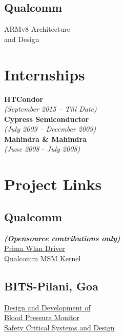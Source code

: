 \documentclass[letterpaper]{deedy-resume} %
\begin{document}
\begin{minipage}[t]{0.25\textwidth}
\subsection{Qualcomm}
\textbullet{} ARMv8 Architecture \\ \hphantom{\textbullet{}} and Design
\lsectionspace %
\section{Internships}
\footnotesize \textbf{HTCondor} \\
\footnotesize \textit{(September 2015 – Till Date)} \\
\footnotesize \textbf{Cypress Semiconductor} \\
\footnotesize \textit{(July 2009 – December 2009)} \\
\footnotesize \textbf{Mahindra \& Mahindra} \\
\footnotesize \textit{(June 2008 - July 2008)}
\lsectionspace %
\section{Project Links}
\subsection{Qualcomm}
\footnotesize \textit{\textbf{(Opensource contributions only)} } \\
\textbullet{} \href{https://www.codeaurora.org/cgit/quic/la/platform/vendor/qcom-opensource/wlan/prima/}{Prima Wlan Driver} \\
\textbullet{} \href{https://www.codeaurora.org/cgit/quic/la/kernel/msm-3.10}{Qualcomm MSM Kernel} \\
\subsection{BITS-Pilani, Goa}
\textbullet{} \href{http://www.scribd.com/doc/248438366/Design-and-Development-of-a-Blood-Pressure-Monitor}{Design and Development of \\ \hphantom{\textbullet{}} Blood Pressure Monitor} \\
\textbullet{} \href{http://www.scribd.com/doc/248440573/Safety-Critical-Systems}{Safety Critical Systems and Design} \\
\lsectionspace %

\end{minipage}
\end{document}
